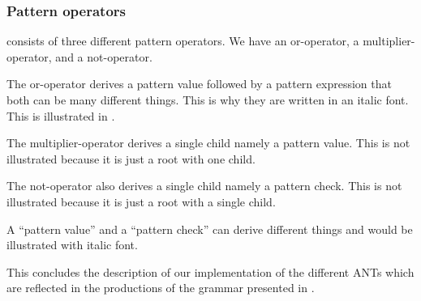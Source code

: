 

\subsubsection{Pattern operators}

\productname{} consists of three different pattern operators. We have an
or-operator, a multiplier-operator, and a not-operator.

The or-operator derives a pattern value followed by a pattern expression that
both can be many different things. This is why they are written in an italic
font. This is illustrated in .



The multiplier-operator derives a single child namely a pattern value. This is
not illustrated because it is just a root with one child.

The not-operator also derives a single child namely a pattern check. This is not
illustrated because it is just a root with a single child.

A ``pattern value'' and a ``pattern check'' can derive different things and
would be illustrated with italic font.

This concludes the description of our implementation of the different ANTs which 
are reflected in the productions of the grammar presented in
.
